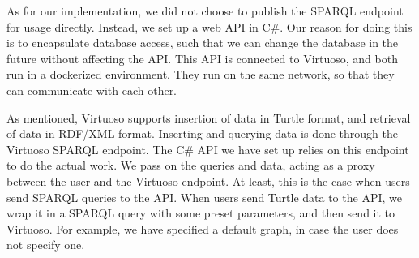 As for our implementation, we did not choose to publish the SPARQL endpoint for \knox{} usage directly. Instead, we set up a web API in C\#.
Our reason for doing this is to encapsulate database access, such that we can change the database in the future without affecting the API.
This API is connected to Virtuoso, and both run in a dockerized environment. They run on the same network, so that they can communicate with each other.

As mentioned, Virtuoso supports insertion of data in Turtle format, and retrieval of data in RDF/XML format. Inserting and querying data is done through the Virtuoso SPARQL endpoint. The C\# API we have set up relies on this endpoint to do the actual work. We pass on the queries and data, acting as a proxy between the user and the Virtuoso endpoint. At least, this is the case when users send SPARQL queries to the API. When users send Turtle data to the API, we wrap it in a SPARQL query with some preset parameters, and then send it to Virtuoso. For example, we have specified a default graph, in case the user does not specify one.


